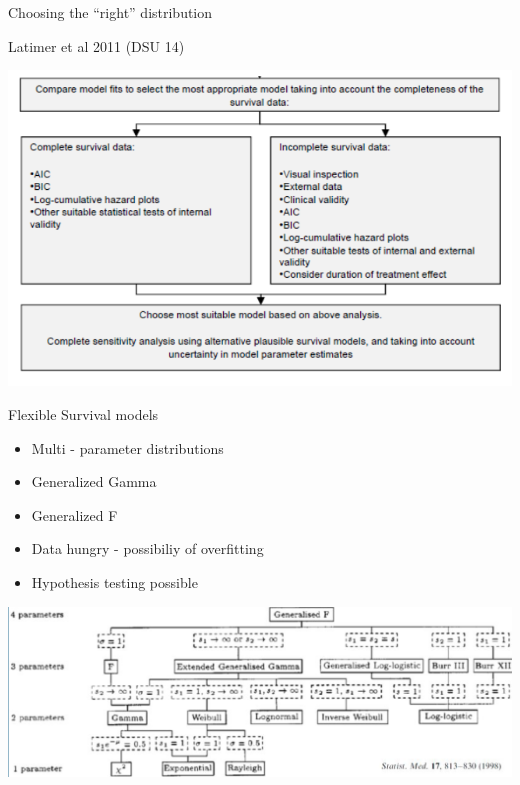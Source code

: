\documentclass[ignorenonframetext,]{beamer}
\providecommand{\tightlist}{%
  \setlength{\itemsep}{0pt}\setlength{\parskip}{0pt}}
\begin{document}
\begin{frame}{Choosing the ``right'' distribution}

Latimer et al 2011 (DSU 14)

\includegraphics[width=1\linewidth]{figures/goflatimer}

\end{frame}

\begin{frame}{Flexible Survival models}

\begin{itemize}
\tightlist
\item
  Multi - parameter distributions
\item
  Generalized Gamma
\item
  Generalized F
\item
  Data hungry - possibiliy of overfitting\\
\item
  Hypothesis testing possible
\end{itemize}

\includegraphics[width=1\linewidth]{figures/genf}

\end{frame}
\end{document}
